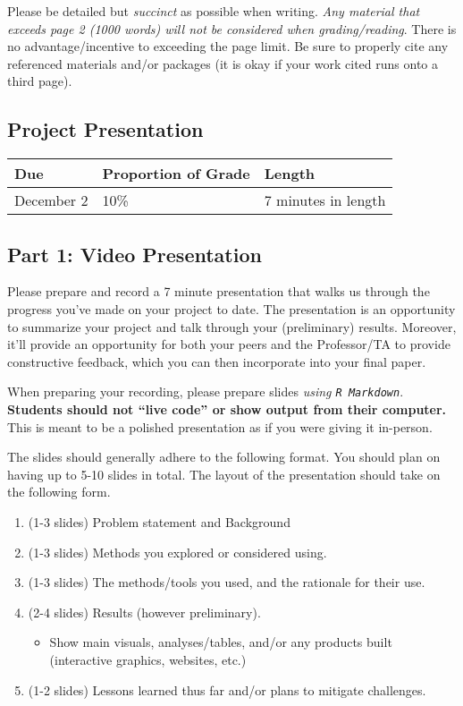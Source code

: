 \documentclass[
  12pt,
]{article}
\providecommand{\tightlist}{%
  \setlength{\itemsep}{0pt}\setlength{\parskip}{0pt}}
\begin{document}
Please be detailed but \emph{succinct} as possible when writing.
\emph{Any material that exceeds page 2 (1000 words) will not be
considered when grading/reading}. There is no advantage/incentive to
exceeding the page limit. Be sure to properly cite any referenced
materials and/or packages (it is okay if your work cited runs onto a
third page).

\hypertarget{project-presentation}{%
\subsection{Project Presentation}\label{project-presentation}}

\begin{longtable}[]{@{}lll@{}}
\toprule
\textbf{Due} & \textbf{Proportion of Grade} &
\textbf{Length}\tabularnewline
\midrule
\endhead
December 2 & 10\% & 7 minutes in length\tabularnewline
\bottomrule
\end{longtable}

\hypertarget{part-1-video-presentation}{%
\subsection{Part 1: Video
Presentation}\label{part-1-video-presentation}}

Please prepare and record a 7 minute presentation that walks us through
the progress you've made on your project to date. The presentation is an
opportunity to summarize your project and talk through your
(preliminary) results. Moreover, it'll provide an opportunity for both
your peers and the Professor/TA to provide constructive feedback, which
you can then incorporate into your final paper.

When preparing your recording, please prepare slides \emph{using
\texttt{R\ Markdown}}. \textbf{Students should not ``live code'' or show
output from their computer.} This is meant to be a polished presentation
as if you were giving it in-person.

The slides should generally adhere to the following format. You should
plan on having up to 5-10 slides in total. The layout of the
presentation should take on the following form.

\begin{enumerate}
\def\labelenumi{\arabic{enumi}.}
\item
  (1-3 slides) Problem statement and Background
\item
  (1-3 slides) Methods you explored or considered using.
\item
  (1-3 slides) The methods/tools you used, and the rationale for their
  use.
\item
  (2-4 slides) Results (however preliminary).

  \begin{itemize}
  \tightlist
  \item
    Show main visuals, analyses/tables, and/or any products built
    (interactive graphics, websites, etc.)
  \end{itemize}
\item
  (1-2 slides) Lessons learned thus far and/or plans to mitigate
  challenges.
\end{enumerate}
\end{document}
